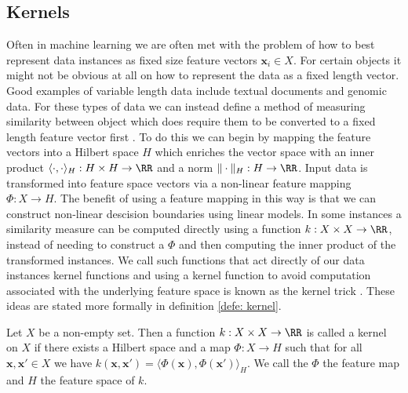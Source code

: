 \subsection{Kernels}\label{Section1.1}

Often in machine learning we are often met with the problem of how to best represent data instances as fixed size feature vectors $\bm{x}_i \in X$. For certain objects it might not be obvious at all on how to represent the data as a fixed length vector. Good examples of variable length data include textual documents and genomic data. For these types of data we can instead define a method of measuring similarity between object which does require them to be converted to a fixed length feature vector first \cite{MurphyKevinP2012Ml}. To do this we can begin by mapping the feature vectors into a Hilbert space $H$ which enriches the vector space with an inner product $\langle \cdot , \cdot \rangle_H : H \times H \to \RR$ and a norm $\| \cdot \|_H : H \to \RR$. Input data is transformed into feature space vectors via a non-linear feature mapping $\Phi : X \to H$. The benefit of using a feature mapping in this way is that we can construct non-linear descision boundaries using linear models. In some instances a similarity measure can be computed directly using a function $k : X \times X \to \RR$, instead of needing to construct a $\Phi$ and then computing the inner product of the transformed instances. We call such functions that act directly of our data instances kernel functions and using a kernel function to avoid computation associated with the underlying feature space is known as the kernel trick \cite{SteinwartIngo2008SVMb}. These ideas are stated more formally in definition \ref{defe: kernel}.

\begin{defe}[Kernel] \label{defe: kernel}
    Let $X$ be a non-empty set. Then a function $k : X \times X \to \RR$ is called a kernel on $X$ if there exists a Hilbert space and a map $\Phi : X \to H$ such that for all $\bm{x} , \bm{x}' \in X$ we have $k \left( \bm{x} , \bm{x}' \right) = \langle \Phi \left( \bm{x} \right), \Phi \left( \bm{x}' \right) \rangle_H$. We call the $\Phi$ the feature map and $H$ the feature space of $k$.
\end{defe}


